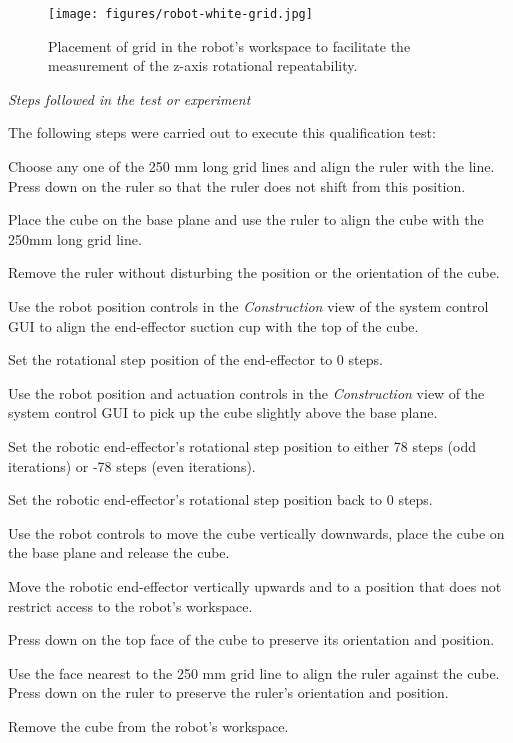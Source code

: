\begin{figure}[!ht]
	\centering
	\texttt{[image: figures/robot-white-grid.jpg]}
	\caption{Placement of grid in the robot's workspace to facilitate the measurement of the z-axis rotational repeatability.}
	\label{fig:qtp5-orientation-grid}
\end{figure}

\textit{Steps followed in the test or experiment}

The following steps were carried out to execute this qualification test:

\begin{compactenum}
	\item Choose any one of the 250 mm long grid lines and align the ruler with the line. Press down on the ruler so that the ruler does not shift from this position.
	\item Place the cube on the base plane and use the ruler to align the cube with the 250mm long grid line.
	\item Remove the ruler without disturbing the position or the orientation of the cube.
	\item Use the robot position controls in the \textit{Construction} view of the system control GUI to align the end-effector suction cup with the top of the cube.
	\item Set the rotational step position of the end-effector to 0 steps.
	\item Use the robot position and actuation controls in the \textit{Construction} view of the system control GUI to pick up the cube slightly above the base plane.
	\item Set the robotic end-effector's rotational step position to either 78 steps (odd iterations) or -78 steps (even iterations).
	\item Set the robotic end-effector's rotational step position back to 0 steps.
	\item Use the robot controls to move the cube vertically downwards, place the cube on the base plane and release the cube.
	\item Move the robotic end-effector vertically upwards and to a position that does not restrict access to the robot's workspace.
	\item Press down on the top face of the cube to preserve its orientation and position. 
	\item Use the face nearest to the 250 mm grid line to align the ruler against the cube. Press down on the ruler to preserve the ruler's orientation and position.
	\item Remove the cube from the robot's workspace.

\end{compactenum}
